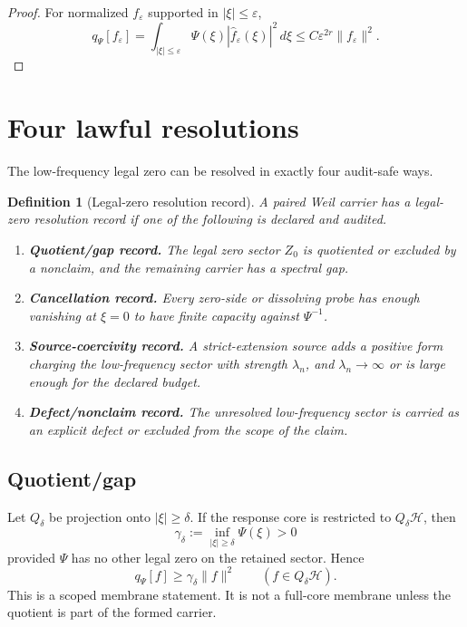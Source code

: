 \documentclass[11pt]{article}
\newtheorem{definition}{Definition}
\begin{document}
\begin{proof}
For normalized \(f_\varepsilon\) supported in \(|\xi|\le\varepsilon\),
\[
q_\Psi[f_\varepsilon]
=\int_{|\xi|\le\varepsilon}\Psi(\xi)|\widehat f_\varepsilon(\xi)|^2\,d\xi
\le C\varepsilon^{2r}\|f_\varepsilon\|^2.
\]
\end{proof}

\section{Four lawful resolutions}
The low-frequency legal zero can be resolved in exactly four audit-safe ways.

\begin{definition}[Legal-zero resolution record]
A paired Weil carrier has a legal-zero resolution record if one of the following is declared and audited.
\begin{enumerate}[label=(\roman*)]
\item \textbf{Quotient/gap record.} The legal zero sector \(Z_0\) is quotiented or excluded by a nonclaim, and the remaining carrier has a spectral gap.
\item \textbf{Cancellation record.} Every zero-side or dissolving probe has enough vanishing at \(\xi=0\) to have finite capacity against \(\Psi^{-1}\).
\item \textbf{Source-coercivity record.} A strict-extension source adds a positive form charging the low-frequency sector with strength \(\lambda_n\), and \(\lambda_n\to\infty\) or is large enough for the declared budget.
\item \textbf{Defect/nonclaim record.} The unresolved low-frequency sector is carried as an explicit defect or excluded from the scope of the claim.
\end{enumerate}
\end{definition}

\subsection{Quotient/gap}
Let \(Q_\delta\) be projection onto \(|\xi|\ge\delta\).  If the response core is restricted to \(Q_\delta\mathcal H\), then
\[
\gamma_\delta:=\inf_{|\xi|\ge\delta}\Psi(\xi)>0
\]
provided \(\Psi\) has no other legal zero on the retained sector.  Hence
\[
q_\Psi[f]\ge \gamma_\delta\|f\|^2\qquad (f\in Q_\delta\mathcal H).
\]
This is a scoped membrane statement.  It is not a full-core membrane unless the quotient is part of the formed carrier.
\end{document}
